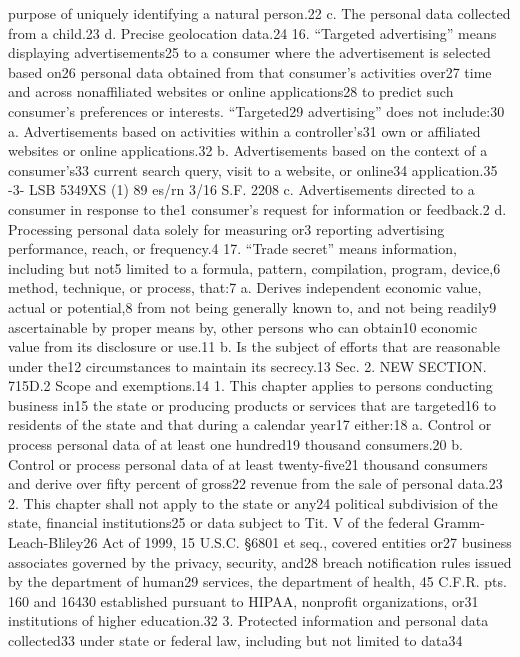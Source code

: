 purpose of uniquely identifying a natural person.22
c. The personal data collected from a child.23
d. Precise geolocation data.24
16. “Targeted advertising” means displaying advertisements25
to a consumer where the advertisement is selected based on26
personal data obtained from that consumer’s activities over27
time and across nonaffiliated websites or online applications28
to predict such consumer’s preferences or interests. “Targeted29
advertising” does not include:30
a. Advertisements based on activities within a controller’s31
own or affiliated websites or online applications.32
b. Advertisements based on the context of a consumer’s33
current search query, visit to a website, or online34
application.35
-3-
LSB 5349XS (1) 89
es/rn 3/16
S.F. 2208
c. Advertisements directed to a consumer in response to the1
consumer’s request for information or feedback.2
d. Processing personal data solely for measuring or3
reporting advertising performance, reach, or frequency.4
17. “Trade secret” means information, including but not5
limited to a formula, pattern, compilation, program, device,6
method, technique, or process, that:7
a. Derives independent economic value, actual or potential,8
from not being generally known to, and not being readily9
ascertainable by proper means by, other persons who can obtain10
economic value from its disclosure or use.11
b. Is the subject of efforts that are reasonable under the12
circumstances to maintain its secrecy.13
Sec. 2. NEW SECTION. 715D.2 Scope and exemptions.14
1. This chapter applies to persons conducting business in15
the state or producing products or services that are targeted16
to residents of the state and that during a calendar year17
either:18
a. Control or process personal data of at least one hundred19
thousand consumers.20
b. Control or process personal data of at least twenty-five21
thousand consumers and derive over fifty percent of gross22
revenue from the sale of personal data.23
2. This chapter shall not apply to the state or any24
political subdivision of the state, financial institutions25
or data subject to Tit. V of the federal Gramm-Leach-Bliley26
Act of 1999, 15 U.S.C. §6801 et seq., covered entities or27
business associates governed by the privacy, security, and28
breach notification rules issued by the department of human29
services, the department of health, 45 C.F.R. pts. 160 and 16430
established pursuant to HIPAA, nonprofit organizations, or31
institutions of higher education.32
3. Protected information and personal data collected33
under state or federal law, including but not limited to data34
